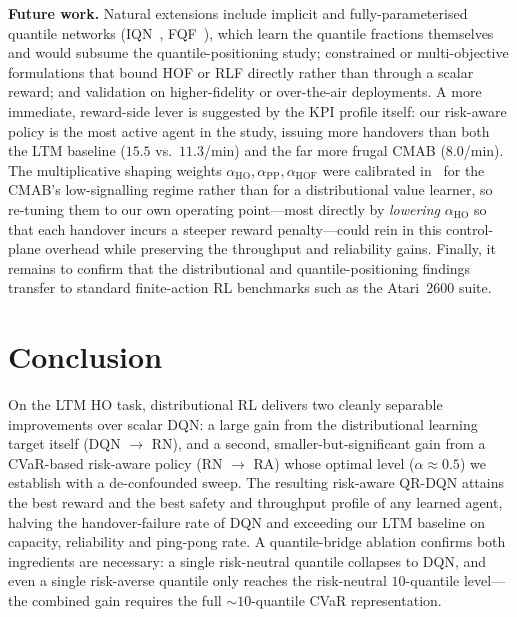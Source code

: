 \documentclass[conference]{IEEEtran}
\begin{document}
\textbf{Future work.} Natural extensions include implicit and
fully-parameterised quantile networks (IQN~\cite{iqn}, FQF~\cite{fqf}), which
learn the quantile fractions themselves and would subsume the
quantile-positioning study; constrained or multi-objective formulations that
bound HOF or RLF directly rather than through a scalar reward; and validation
on higher-fidelity or over-the-air deployments. A more immediate,
reward-side lever is suggested by the KPI profile itself: our risk-aware
policy is the most active agent in the study, issuing more handovers than
both the LTM baseline ($15.5$ vs.\ $11.3$/min) and the far more frugal CMAB
($8.0$/min). The multiplicative shaping weights
$\alpha_{\mathrm{HO}},\alpha_{\mathrm{PP}},\alpha_{\mathrm{HOF}}$ were
calibrated in~\cite{cmab_ho} for the CMAB's low-signalling regime rather than
for a distributional value learner, so re-tuning them to our own operating
point---most directly by \emph{lowering} $\alpha_{\mathrm{HO}}$ so that each
handover incurs a steeper reward penalty---could rein in this control-plane
overhead while preserving the throughput and reliability gains. Finally, it remains to confirm that the distributional and quantile-positioning
findings transfer to standard finite-action RL benchmarks such as the
Atari~2600 suite.

\section{Conclusion}
\label{sec:conclusion}
On the LTM HO task, distributional RL delivers two cleanly separable
improvements over scalar DQN: a large gain from the distributional learning
target itself (DQN $\to$ RN), and a second, smaller-but-significant gain from a
CVaR-based risk-aware policy (RN $\to$ RA) whose optimal level
($\alpha\approx0.5$) we establish with a de-confounded sweep. The resulting
risk-aware QR-DQN attains the best reward and the best safety and throughput
profile of any learned agent, halving the handover-failure rate of DQN and
exceeding our LTM baseline on capacity, reliability and ping-pong rate.
A quantile-bridge ablation confirms both ingredients are necessary: a single
risk-neutral quantile collapses to DQN, and even a single risk-averse quantile
only reaches the risk-neutral $10$-quantile level---the combined gain requires
the full $\sim\!10$-quantile CVaR representation.

\end{document}
